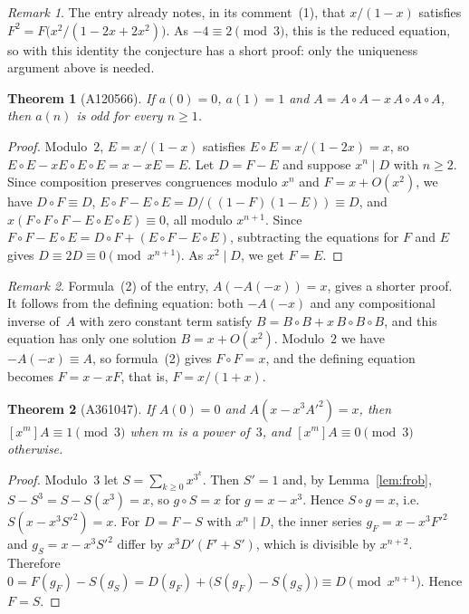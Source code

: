 \documentclass[11pt]{article}
\newtheorem{theorem}{Theorem}
\theoremstyle{remark}
\newtheorem*{remark*}{Remark}
\begin{document}
\begin{remark*}
The entry already notes, in its comment~(1), that $x/(1-x)$ satisfies
$F^2=F\bigl(x^2/(1-2x+2x^2)\bigr)$. As $-4\equiv2\pmod3$, this is the reduced
equation, so with this identity the conjecture has a short proof: only the
uniqueness argument above is needed.
\end{remark*}

\begin{theorem}[A120566]\label{thm:120566}
If $a(0)=0$, $a(1)=1$ and $A=A\circ A-x\,A\circ A\circ A$, then $a(n)$ is odd
for every $n\ge1$.
\end{theorem}
\begin{proof}
Modulo~$2$, $E=x/(1-x)$ satisfies $E\circ E=x/(1-2x)=x$, so
$E\circ E-xE\circ E\circ E=x-xE=E$. Let $D=F-E$ and suppose $x^n\mid D$ with
$n\ge2$. Since composition preserves congruences modulo $x^n$ and
$F=x+O(x^2)$, we have $D\circ F\equiv D$,
$E\circ F-E\circ E=D/((1-F)(1-E))\equiv D$, and
$x(F\circ F\circ F-E\circ E\circ E)\equiv0$, all modulo $x^{n+1}$. Since
$F\circ F-E\circ E=D\circ F+(E\circ F-E\circ E)$, subtracting the equations
for $F$ and $E$ gives $D\equiv2D\equiv0\pmod{x^{n+1}}$. As $x^2\mid D$, we get
$F=E$.
\end{proof}

\begin{remark*}
Formula~(2) of the entry, $A(-A(-x))=x$, gives a shorter proof. It follows
from the defining equation: both $-A(-x)$ and any compositional inverse of~$A$
with zero constant term satisfy $B=B\circ B+x\,B\circ B\circ B$, and this equation has only
one solution $B=x+O(x^2)$. Modulo~$2$ we have $-A(-x)\equiv A$, so
formula~(2) gives $F\circ F=x$, and the defining equation becomes $F=x-xF$,
that is, $F=x/(1+x)$.
\end{remark*}

\begin{theorem}[A361047]\label{thm:361047}
If $A(0)=0$ and $A(x-x^3A'^2)=x$, then $[x^m]A\equiv1\pmod3$ when $m$ is a
power of~$3$, and $[x^m]A\equiv0\pmod3$ otherwise.
\end{theorem}
\begin{proof}
Modulo~$3$ let $S=\sum_{k\ge0}x^{3^k}$. Then $S'=1$ and, by
Lemma~\ref{lem:frob}, $S-S^3=S-S(x^3)=x$, so $g\circ S=x$ for $g=x-x^3$.
Hence $S\circ g=x$, i.e.\ $S(x-x^3S'^2)=x$. For $D=F-S$ with $x^n\mid D$, the
inner series $g_F=x-x^3F'^2$ and $g_S=x-x^3S'^2$ differ by $x^3D'(F'+S')$,
which is divisible by $x^{n+2}$. Therefore
$0=F(g_F)-S(g_S)=D(g_F)+\bigl(S(g_F)-S(g_S)\bigr)\equiv D\pmod{x^{n+1}}$.
Hence $F=S$.
\end{proof}
\end{document}
